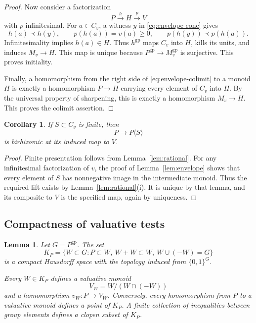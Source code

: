 \documentclass[11pt]{article}
\newtheorem{lemma}[theorem]{Lemma}
\newtheorem{corollary}[theorem]{Corollary}
\theoremstyle{definition}
\theoremstyle{remark}
\newcommand{\gp}{\mathrm{gp}}
\begin{document}
\begin{proof}
Now consider a factorization
\[
P\xrightarrow{h}H\xrightarrow{p}V
\]
with \(p\) infinitesimal. For \(a\in C_v\), a witness \(y\) in
\eqref{eq:envelope-cone} gives
\[
h(a)\prec h(y),\qquad p(h(a))=v(a)\ge0,\qquad
p(h(y))\prec p(h(a)).
\]
Infinitesimality implies \(h(a)\in H\).
Thus \(h^{\gp}\) maps \(C_v\) into \(H\), kills its units, and
induces \(M_v\to H\). This map is unique because
\(P^{\gp}\to M_v^{\gp}\) is surjective. This proves initiality.

Finally, a homomorphism from the right side of
\eqref{eq:envelope-colimit} to a monoid \(H\) is exactly a
homomorphism \(P\to H\) carrying every element of \(C_v\) into \(H\).
By the universal property of sharpening, this is exactly a
homomorphism \(M_v\to H\). This proves the colimit assertion.
\end{proof}

\begin{corollary}\label{cor:admissible}
If \(S\subset C_v\) is finite, then
\[
P\longrightarrow P\langle S\rangle
\]
is birhizomic at its induced map to \(V\).
\end{corollary}

\begin{proof}
Finite presentation follows from Lemma~\ref{lem:rational}.
For any infinitesimal factorization of \(v\), the proof of
Lemma~\ref{lem:envelope} shows that every element of \(S\) has
nonnegative image in the intermediate monoid. Thus the required
lift exists by Lemma~\ref{lem:rational}(i). It is unique by that
lemma, and its composite to \(V\) is the specified map, again by
uniqueness.
\end{proof}

\subsection{Compactness of valuative tests}

\begin{lemma}\label{lem:valuation-compactness}
Let \(G=P^{\gp}\). The set
\[
K_P=
\{W\subset G:
P\subset W,\ W+W\subset W,\ W\cup(-W)=G\}
\]
is a compact Hausdorff space with the topology induced from
\(\{0,1\}^{G}\).

Every \(W\in K_P\) defines a valuative monoid
\[
V_W=W/(W\cap(-W))
\]
and a homomorphism \(v_W:P\to V_W\). Conversely, every homomorphism
from \(P\) to a valuative monoid defines a point of \(K_P\).
A finite collection of inequalities between group elements defines
a clopen subset of \(K_P\).
\end{lemma}
\end{document}
